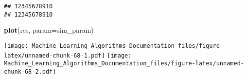 \documentclass[
]{article}
\newenvironment{Shaded}{\begin{snugshade}}{\end{snugshade}}
\newcommand{\DataTypeTok}[1]{\textcolor[rgb]{0.13,0.29,0.53}{#1}}
\newcommand{\KeywordTok}[1]{\textcolor[rgb]{0.13,0.29,0.53}{\textbf{#1}}}
\newcommand{\NormalTok}[1]{#1}
\newcommand{\OperatorTok}[1]{\textcolor[rgb]{0.81,0.36,0.00}{\textbf{#1}}}
\newcommand{\OtherTok}[1]{\textcolor[rgb]{0.56,0.35,0.01}{#1}}
\newcommand{\StringTok}[1]{\textcolor[rgb]{0.31,0.60,0.02}{#1}}
\begin{document}
\begin{verbatim}
## 12345678910
## 12345678910
\end{verbatim}

\begin{Shaded}
\begin{Highlighting}[]
\KeywordTok{plot}\NormalTok{(res, }\DataTypeTok{param=}\NormalTok{sim_param)}
\end{Highlighting}
\end{Shaded}

\texttt{[image: Machine\_Learning\_Algorithms\_Documentation\_files/figure-latex/unnamed-chunk-68-1.pdf]}
\texttt{[image: Machine\_Learning\_Algorithms\_Documentation\_files/figure-latex/unnamed-chunk-68-2.pdf]}

\begin{Shaded}
\end{Shaded}
\end{document}
